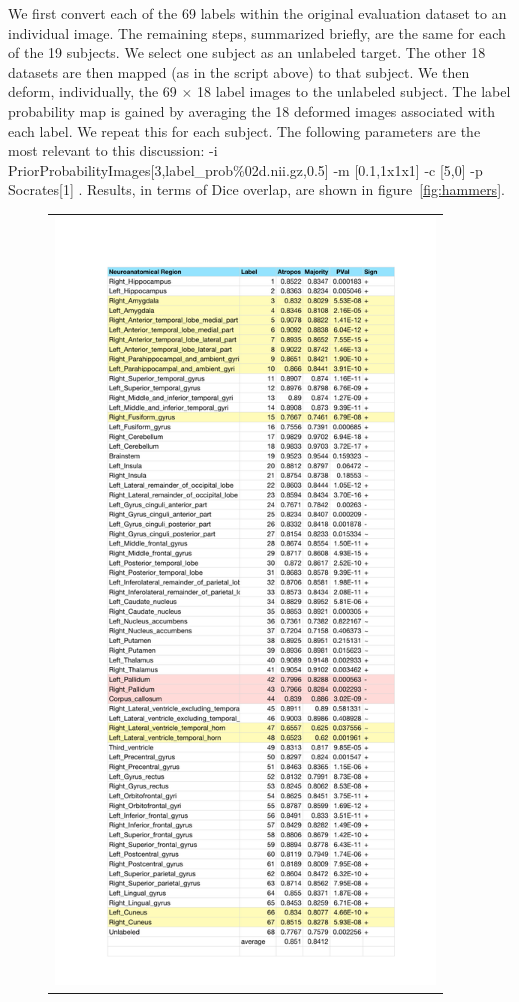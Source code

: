 \documentclass[11pt,english]{article}
\begin{document}
We first convert each of the 69 labels within the original evaluation
dataset to an individual image.  The remaining steps,
summarized briefly, are the same for each of the 19 subjects.  We
select one subject as an unlabeled target.  The other 18 datasets are
then mapped (as in the script above) to that subject.  We then deform,
individually, the 69 $\times$ 18 label images to the unlabeled
subject.  The label probability map is gained by averaging the 18
deformed images associated with each label.  We repeat this for each
subject.  The following parameters are the most relevant to this discussion:
{\ttfamily  -i  PriorProbabilityImages[3,label\_prob\%02d.nii.gz,0.5] 
-m [0.1,1x1x1] -c [5,0] -p Socrates[1] }.  Results, in terms of
Dice overlap, are shown in figure~\ref{fig:hammers}.
\begin{figure}
\begin{center}
\begin{tabular}{c}
\includegraphics[height=8in]{Figures/final_results_majority_vote_vs_atropos.pdf}

\end{tabular}
\end{center}
\end{figure}
\end{document}

